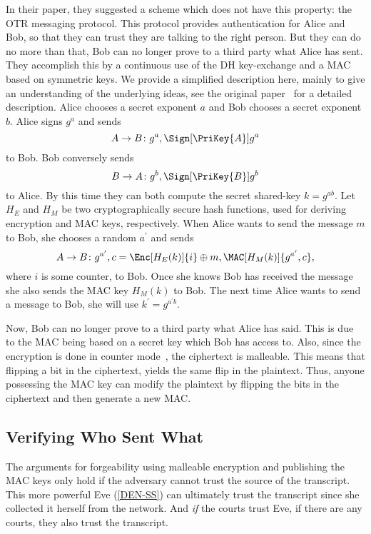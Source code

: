 In their paper, they suggested a scheme which does not have this property: the 
\ac{OTR} messaging protocol.
This protocol provides authentication for Alice and Bob, so that they can trust 
they are talking to the right person.
But they can do no more than that, Bob can no longer prove to a third party 
what Alice has sent.
They accomplish this by a continuous use of the \ac{DH} key-exchange and 
a \ac{MAC} based on symmetric keys.
We provide a simplified description here, mainly to give an understanding of 
the underlying ideas, see the original paper~\cite{otr2004} for a detailed 
description.
Alice chooses a secret exponent \(a\) and Bob chooses a secret exponent \(b\).
Alice signs \(g^a\) and sends \[
  A\to B\colon g^a, \Sign[\PriKey{A}]{ g^a }
\] to Bob.
Bob conversely sends \[%
  B\to A\colon g^b, \Sign[\PriKey{B}]{ g^b }
\] to Alice.
By this time they can both compute the secret shared-key \(k = g^{ab}\).
Let \(H_E\) and \(H_M\) be two cryptographically secure hash functions, used 
for deriving encryption and \ac{MAC} keys, respectively.
When Alice wants to send the message \(m\) to Bob, she chooses a random 
\(a^\prime\) and sends \[
  A\to B\colon g^{a^\prime}, c = \Enc[H_E( k )]{ i }\oplus m,
  \MAC[H_M( k )]{ g^{a^\prime}, c },
\] where \(i\) is some counter, to Bob.
Once she knows Bob has received the message she also sends the \ac{MAC} key 
\(H_M( k )\) to Bob.
The next time Alice wants to send a message to Bob, she will use \(k^\prime 
= g^{a^\prime b}\).

Now, Bob can no longer prove to a third party what Alice has said.
This is due to the \ac{MAC} being based on a secret key which Bob has access 
to.
Also, since the encryption is done in counter mode~\cite{blockmodes}, the 
ciphertext is malleable.
This means that flipping a bit in the ciphertext, yields the same flip in the 
plaintext.
Thus, anyone possessing the \ac{MAC} key can modify the plaintext by flipping 
the bits in the ciphertext and then generate a new \ac{MAC}.

\subsection{Verifying Who Sent What}

The arguments for forgeability using malleable encryption and publishing the 
\ac{MAC} keys only hold if the adversary cannot trust the source of the 
transcript.
This more powerful Eve (\cref{DEN-SS}) can ultimately trust the transcript 
since she collected it herself from the network.
And \emph{if} the courts trust Eve, if there are any courts, they also trust 
the transcript.

